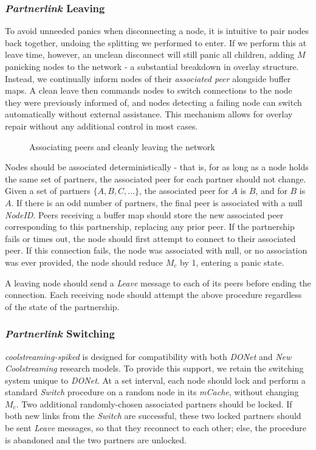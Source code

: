 \documentclass[12pt,a4paper]{article}
\begin{document}
\subsubsection{\textit{Partnerlink} Leaving} \label{css:partnerlink:leaving}
To avoid unneeded panics when disconnecting a node, it is intuitive to pair nodes back together, undoing the splitting we performed to enter. If we perform this at leave time, however, an unclean disconnect will still panic all children, adding \(M\) panicking nodes to the network - a substantial breakdown in overlay structure. Instead, we continually inform nodes of their \textit{associated peer} alongside buffer maps. A clean leave then commands nodes to switch connections to the node they were previously informed of, and nodes detecting a failing node can switch automatically without external assistance. This mechanism allows for overlay repair without any additional control in most cases.

\begin{figure}[!ht]
	\centering
	\resizebox{0.8\textwidth}{!}{%
		
	}%
	\caption{Associating peers and cleanly leaving the network}
	\label{leave}
\end{figure}

Nodes should be associated deterministically - that is, for as long as a node holds the same set of partners, the associated peer for each partner should not change. Given a set of partners \(\{A, B, C, ...\}\), the associated peer for \(A\) is \(B\), and for \(B\) is \(A\). If there is an odd number of partners, the final peer is associated with a null \textit{NodeID}. Peers receiving a buffer map should store the new associated peer corresponding to this partnership, replacing any prior peer. If the partnership fails or times out, the node should first attempt to connect to their associated peer. If this connection fails, the node was associated with null, or no association was ever provided, the node should reduce \(M_c\) by 1, entering a panic state.

A leaving node should send a \textit{Leave} message to each of its peers before ending the connection. Each receiving node should attempt the above procedure regardless of the state of the partnership.

\subsubsection{\textit{Partnerlink} Switching} \label{css:partnerlink:switching}
\textit{coolstreaming-spiked} is designed for compatibility with both \textit{DONet} and \textit{New Coolstreaming} research models. To provide this support, we retain the switching system unique to \textit{DONet}. At a set interval, each node should lock and perform a standard \textit{Switch} procedure on a random node in its \textit{mCache}, without changing \(M_c\). Two additional randomly-chosen associated partners should be locked. If both new links from the \textit{Switch} are successful, these two locked partners should be sent \textit{Leave} messages, so that they reconnect to each other; else, the procedure is abandoned and the two partners are unlocked.
\end{document}

